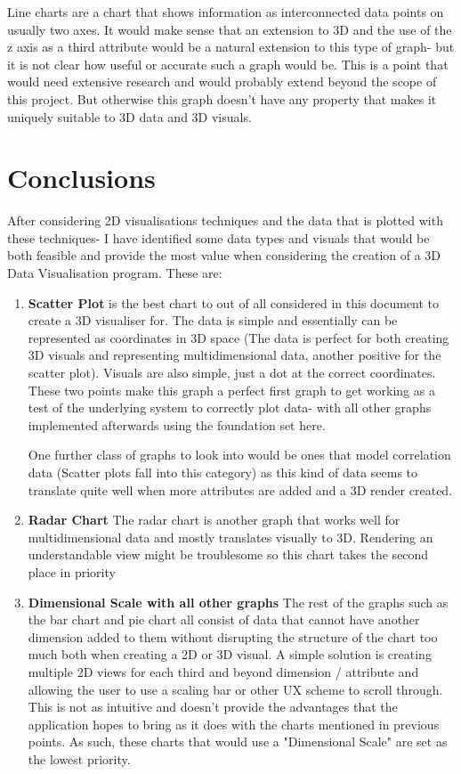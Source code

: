 \documentclass{report}
\begin{document}
Line charts are a chart that shows information as interconnected data points on usually two axes. It would make sense that an extension to 3D and the use of the z axis as a third attribute would be a natural extension to this type of graph- but it is not clear how useful or accurate such a graph would be. This is a point that would need extensive research and would probably extend beyond the scope of this project. But otherwise this graph doesn't have any property that makes it uniquely suitable to 3D data and 3D visuals.

\part{Conclusions}

After considering 2D visualisations techniques and the data that is plotted with these techniques- I have identified some data types and visuals that would be both feasible and provide the most value when considering the creation of a 3D Data Visualisation program. These are:

\begin{enumerate}
    \item \textbf{Scatter Plot} is the best chart to out of all considered in this document to create a 3D visualiser for. The data is simple and essentially can be represented as coordinates in 3D space (The data is perfect for both creating 3D visuals and representing multidimensional data, another positive for the scatter plot). Visuals are also simple, just a dot at the correct coordinates. These two points make this graph a perfect first graph to get working as a test of the underlying system to correctly plot data- with all other graphs implemented afterwards using the foundation set here. 
    
    One further class of graphs to look into would be ones that model correlation data (Scatter plots fall into this category) as this kind of data seems to translate quite well when more attributes are added and a 3D render created.
    
    \item \textbf{Radar Chart} The radar chart is another graph that works well for multidimensional data and mostly translates visually to 3D. Rendering an understandable view might be troublesome so this chart takes the second place in priority
    
    \item \textbf{Dimensional Scale with all other graphs} The rest of the graphs such as the bar chart and pie chart all consist of data that cannot have another dimension added to them without disrupting the structure of the chart too much both when creating a 2D or 3D visual. A simple solution is creating multiple 2D views for each third and beyond dimension / attribute and allowing the user to use a scaling bar or other UX scheme to scroll through. This is not as intuitive and doesn't provide the advantages that the application hopes to bring as it does with the charts mentioned in previous points. As such, these charts that would use a "Dimensional Scale" are set as the lowest priority.
\end{enumerate}
\end{document}
